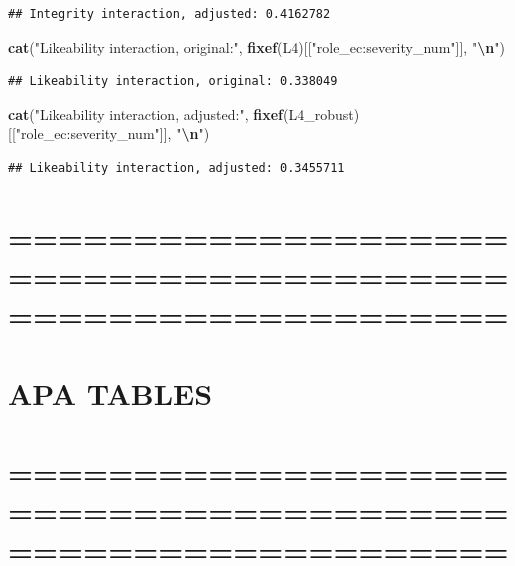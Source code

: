 \documentclass[
]{article}
\newenvironment{Shaded}{\begin{snugshade}}{\end{snugshade}}
\newcommand{\FunctionTok}[1]{\textcolor[rgb]{0.13,0.29,0.53}{\textbf{#1}}}
\newcommand{\NormalTok}[1]{#1}
\newcommand{\SpecialCharTok}[1]{\textcolor[rgb]{0.81,0.36,0.00}{\textbf{#1}}}
\newcommand{\StringTok}[1]{\textcolor[rgb]{0.31,0.60,0.02}{#1}}
\begin{document}
\begin{verbatim}
## Integrity interaction, adjusted: 0.4162782
\end{verbatim}

\begin{Shaded}
\begin{Highlighting}[]
\FunctionTok{cat}\NormalTok{(}\StringTok{"Likeability interaction, original:"}\NormalTok{,}
    \FunctionTok{fixef}\NormalTok{(L4)[[}\StringTok{"role\_ec:severity\_num"}\NormalTok{]], }\StringTok{"}\SpecialCharTok{\textbackslash{}n}\StringTok{"}\NormalTok{)}
\end{Highlighting}
\end{Shaded}

\begin{verbatim}
## Likeability interaction, original: 0.338049
\end{verbatim}

\begin{Shaded}
\begin{Highlighting}[]
\FunctionTok{cat}\NormalTok{(}\StringTok{"Likeability interaction, adjusted:"}\NormalTok{,}
    \FunctionTok{fixef}\NormalTok{(L4\_robust)[[}\StringTok{"role\_ec:severity\_num"}\NormalTok{]], }\StringTok{"}\SpecialCharTok{\textbackslash{}n}\StringTok{"}\NormalTok{)}
\end{Highlighting}
\end{Shaded}

\begin{verbatim}
## Likeability interaction, adjusted: 0.3455711
\end{verbatim}

\section{============================================================}\label{section}

\section{APA TABLES}\label{apa-tables}

\section{============================================================}\label{section-1}
\end{document}
